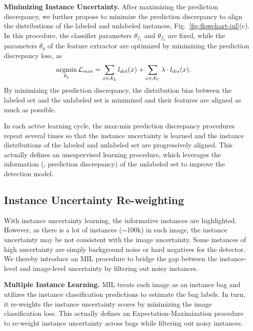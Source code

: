 \documentclass[final]{cvpr}
\DeclareMathOperator*{\argmin}{argmin}
\begin{document}
\textbf{Minimizing Instance Uncertainty.} After maximizing the prediction discrepancy, we further propose to minimize the prediction discrepancy to align the distributions of the labeled and unlabeled instances, Fig.~\ref{fig:flowchart-iul}(c).
In this procedure, the classifier parameters $\theta_{f_1}$ and $\theta_{f_2}$ are fixed, while the parameters $\theta_g$ of the feature extractor are optimized by minimizing the prediction discrepancy loss, as 
\begin{equation}
    \label{eq_min_discrepancy}
    \begin{split}
        \argmin_{\theta_g}{\cal L}_{min} & = \sum_{x\in {\cal X}_L}l_{det}(x) + 
        \sum_{x\in {\cal X}_U} \lambda \cdot l_{dis}(x).
    \end{split}
\end{equation}
By minimizing the prediction discrepancy, the distribution bias between the labeled set and the unlabeled set is minimized and their features are aligned as much as possible. 

In each active learning cycle, the max-min prediction discrepancy procedures repeat several times so that the instance uncertainty is learned and the instance distributions of the labeled and unlabeled set are progressively aligned. This actually defines an unsupervised learning procedure, which leverages the information (\ie, prediction discrepancy) of the unlabeled set to improve the detection model. 

\subsection{Instance Uncertainty Re-weighting}
With instance uncertainty learning, the informative instances are highlighted. However, as there is a lot of instances ($\sim$100k) in each image, the instance uncertainty may be not consistent with the image uncertainty. Some instances of high uncertainty are simply background noise or hard negatives for the detector. We thereby introduce an MIL procedure to bridge the gap between the instance-level and image-level uncertainty by filtering out noisy instances.

\textbf{Multiple Instance Learning.} MIL treats each image as an instance bag and utilizes the instance classification predictions to estimate the bag labels. In turn, it re-weights the instance uncertainty scores by minimizing the image classification loss. This actually defines an Expectation-Maximization procedure~\cite{andrews2002MIL, Bilen2016Weakly} to re-weight instance uncertainty across bags while filtering out noisy instances. 
\end{document}
